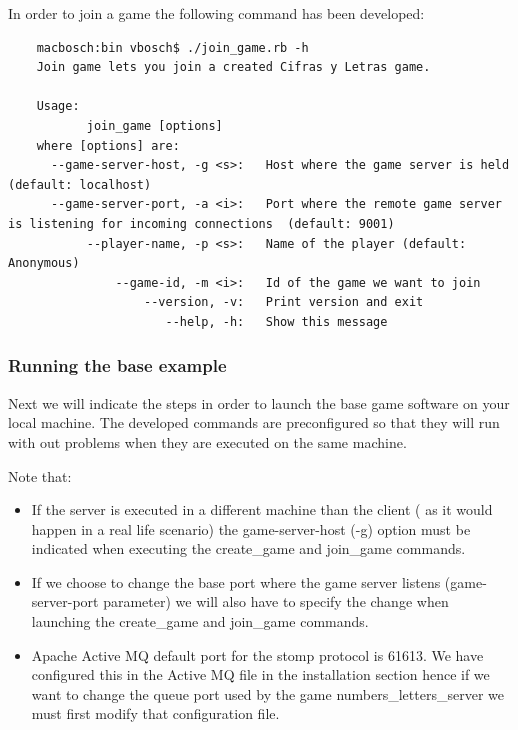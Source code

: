 \documentclass[a4paper,10pt,titlepage]{article}
\begin{document}
\par In order to join a game the following command has been developed:

{\footnotesize\begin{verbatim}
	macbosch:bin vbosch$ ./join_game.rb -h
	Join game lets you join a created Cifras y Letras game.

	Usage:
	       join_game [options]
	where [options] are:
	  --game-server-host, -g <s>:   Host where the game server is held (default: localhost)
	  --game-server-port, -a <i>:   Port where the remote game server is listening for incoming connections  (default: 9001)
	       --player-name, -p <s>:   Name of the player (default: Anonymous)
	           --game-id, -m <i>:   Id of the game we want to join
	               --version, -v:   Print version and exit
	                  --help, -h:   Show this message
\end{verbatim}}

\subsubsection{Running the base example}

\par Next we will indicate the steps in order to launch the base game software on your local machine. The developed commands are preconfigured so that they will run with out problems when they are executed on the same machine.

\par Note that:
\begin{itemize}
	\item If the server is executed in a different machine than the client ( as it would happen in a real life scenario) the game-server-host (-g) option must be indicated when executing the create\_game and join\_game commands. 
	\item If we choose to change the base port where the game server listens (game-server-port parameter) we will also have to specify the change when launching the create\_game and join\_game commands.
	\item Apache Active MQ default port for the stomp protocol is 61613. We have configured this in the Active MQ file in the installation section hence if we want to change the queue port used by the game numbers\_letters\_server we must first modify that configuration file. 
\end{itemize} 
\end{document}
